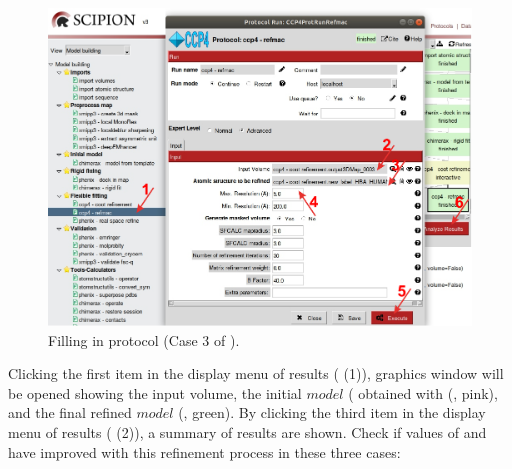   \begin{figure}[H]
  \centering 
  \captionsetup{width=.9\linewidth} 
  \includegraphics[width=1\textwidth]{Images/Fig31}
  \caption{Filling in  protocol (Case 3 of ).}
  \label{fig:refmac_protocol}
  \end{figure}
  Clicking the first item in the display menu of results ( (1)), \chimera graphics window will be opened showing the input volume, the initial $model$ ( obtained with \coot (, pink), and the final  refined $model$ (, green). By clicking the third item in the display menu of results ( (2)), a summary of  results are shown. Check if values of  and  have improved with this refinement process in these three cases:
  
